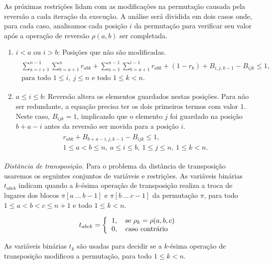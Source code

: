 As próximas restrições lidam com as modificações na permutação causada
pela reversão a cada iteração da execução. A análise será dividida em
dois casos onde, para cada caso, analisamos cada posição $i$ da
permutação para verificar seu valor após a operação de reversão
$\rho(a,b)$ ser completada.
\begin{enumerate}
\item{$i < a$ ou $i > b$:
Posições que não são modificadas.
\begin{align}
  \begin{split}
  \sum_{a=i+1}^{n-1}\sum_{b=a+1}^{n} r_{abk} +
  \sum_{a=1}^{n-1}\sum_{b=a+1}^{i-1} r_{abk} +
  (1 - r_{k}) + B_{i,j,k-1} - B_{ijk} \le 1, \\
  \text{para todo $1 \le i,~j \le n$ e todo $1 \le k < n$}.\end{split}
  \label{eq:rev3}
\end{align}}
\item{$a \le i \le b$:
Reversão altera os elementos guardados nestas posições. Para não ser
redundante, a equação precisa ter os dois primeiros termos com valor
$1$. Neste caso, $B_{ijk} = 1$, implicando que o elemento $j$ foi
guardado na posição $b+a-i$ antes da reversão ser movida para a
posição $i$.
\begin{align}
  \begin{split}
  r_{abk} + B_{b+a-i,j,k-1} - B_{ijk} \le 1, \\
  \text{$1 \le a < b \le n,~a \le i \le b,~1 \le j
    \le n,~1 \le k < n$}.
  \end{split}
  \label{eq:rev4}
\end{align}}
\end{enumerate}

\textit{Distância de transposição.}
Para o problema da distância de transposição usaremos os seguintes
conjuntos de variáveis e restrições. As variáveis binárias $t_{abck}$
indicam quando a $k$-ésima operação de transposição realiza a troca de
lugares dos blocos $\pi[a~\ldots~b - 1]$ e $\pi[b~\ldots~c - 1]$ da
permutação $\pi$, para todo $1 \le a < b < c \le n + 1$ e todo $ 1 \le
k < n$.

\[ 
  t_{abck} = \left \{ 
  \begin{tabular}{ll} 
  1, & se $\rho_{k} = \rho(a,b,c)$ \\ 
  0, & caso contrário 
  \end{tabular} \right .
\] 

As variáveis binárias $t_{k}$ são usadas para decidir se a $k$-ésima
operação de transposição modificou a permutação, para todo $ 1 \le k <
n$.

